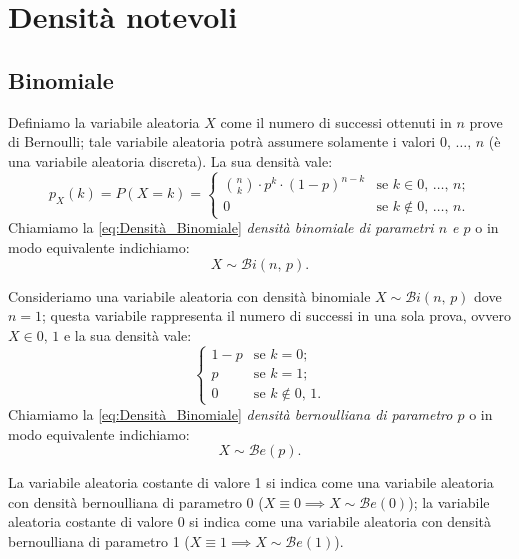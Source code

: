     \section{Densità notevoli}
        \subsection{Binomiale}
            \begin{defn}\label{defn:Densità_Binomiale}
                Definiamo la variabile aleatoria $X$ come il numero di successi ottenuti in $n$ prove di Bernoulli; tale variabile aleatoria potrà assumere solamente i valori $0,\, \ldots,\, n$ (è una variabile aleatoria discreta).
                La sua densità vale:
                \begin{equation}\label{eq:Densità_Binomiale}
                    p_X(k) = P(X = k) = \begin{cases}
                        \binom{n}{k}\cdot p^k\cdot (1-p)^{n-k} & \text{se $k \in {0,\, \ldots,\, n}$;}\\
                        0 & \text{se $k \notin {0,\, \ldots,\, n}$.}
                    \end{cases}
                \end{equation}
                Chiamiamo la \eqref{eq:Densità_Binomiale} \emph{densità binomiale di parametri $n$ e $p$} o in modo equivalente indichiamo: \[
                    X \sim \mathcal{B}i(n,\,p)
                .\]
            \end{defn}
            \begin{defn}\label{defn:Densità_Bernoulliana}
                Consideriamo una variabile aleatoria con densità binomiale $X \sim \mathcal{B}i(n,\,p)$ dove $n = 1$; questa variabile rappresenta il numero di successi in una sola prova, ovvero $X \in {0,\, 1}$ e la sua densità vale:
                \begin{equation}\label{eq:Densità_Bernoulliana}
                    \begin{cases}
                        1-p & \text{se $k=0$;} \\
                        p & \text{se $k=1$;} \\
                        0 & \text{se $k \notin {0,\, 1}$.}
                    \end{cases}
                \end{equation}
                Chiamiamo la \eqref{eq:Densità_Binomiale} \emph{densità bernoulliana di parametro $p$} o in modo equivalente indichiamo: \[
                    X \sim \mathcal{B}e(p)
                .\] 
            \end{defn}
            \begin{obsv}
                La variabile aleatoria costante di valore 1 si indica come una variabile aleatoria con densità bernoulliana di parametro 0 ($X \equiv 0 \implies X \sim \mathcal{B}e(0)$); la variabile aleatoria costante di valore 0 si indica come una variabile aleatoria con densità bernoulliana di parametro 1 ($X \equiv 1 \implies X \sim \mathcal{B}e(1)$).
            \end{obsv}
